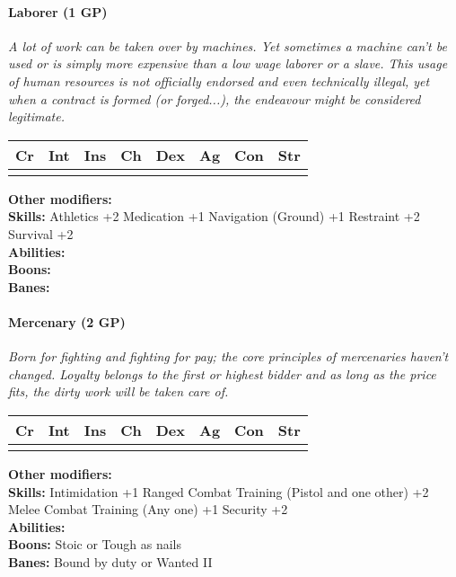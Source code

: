 \documentclass[12pt,a4paper,openany]{book}
\begin{document}
	\paragraph*{Laborer (1 GP)}
	\textit{A lot of work can be taken over by machines. Yet sometimes a machine can't be used or is simply more expensive than a low wage laborer or a slave. This usage of human resources is not officially endorsed and even technically illegal, yet when a contract is formed (or forged...), the endeavour might be considered legitimate.}\par
	\begin{tabular}{|l|l|l|l|l|l|l|l|}
		\hline
		Cr & Int & Ins & Ch & Dex & Ag & Con & Str \\ \hline
		&  &  &  &  &  &  &  \\ \hline
	\end{tabular}\par
	\noindent\textbf{Other modifiers:} \\
	\textbf{Skills:} Athletics +2
	Medication +1
	Navigation (Ground) +1
	Restraint +2
	Survival +2\\
	\textbf{Abilities:} \\
	\textbf{Boons:} \\
	\textbf{Banes:} \\
	
	\hrulefill
	\paragraph*{Mercenary (2 GP)}
	\textit{Born for fighting and fighting for pay; the core principles of mercenaries haven't changed. Loyalty belongs to the first or highest bidder and as long as the price fits, the dirty work will be taken care of.}\par
	\begin{tabular}{|l|l|l|l|l|l|l|l|}
		\hline
		Cr & Int & Ins & Ch & Dex & Ag & Con & Str \\ \hline
		&  &  &  &  &  &  &  \\ \hline
	\end{tabular}\par
	\noindent\textbf{Other modifiers:} \\
	\textbf{Skills:} Intimidation +1
	Ranged Combat Training (Pistol and one other) +2
	Melee Combat Training (Any one) +1
	Security +2\\
	\textbf{Abilities:} \\
	\textbf{Boons:} Stoic or Tough as nails\\
	\textbf{Banes:} Bound by duty or Wanted II\\
	
\end{document}
